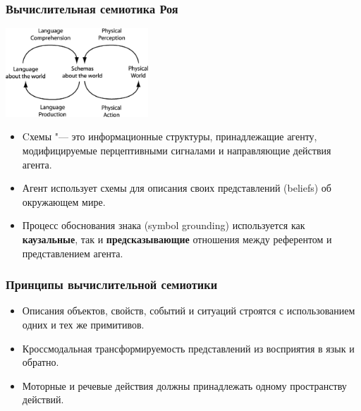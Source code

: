 \documentclass[default]{beamer}
\begin{document}
	\begin{frame}
		\frametitle{Вычислительная семиотика Роя}
		
		\begin{center}
			\includegraphics[width=0.4\textwidth]{roy_grounding}
		\end{center}

		\begin{itemize}
			\item Cхемы "--- это информационные структуры, принадлежащие агенту, модифицируемые перцептивными сигналами и направляющие действия агента.
			\item Агент использует схемы для описания своих представлений (beliefs) об окружающем мире.
			\item Процесс обоснования знака (symbol grounding) используется как \textbf{каузальные}, так и \textbf{предсказывающие} отношения между референтом и представлением агента.
		\end{itemize}
	\end{frame}

	\begin{frame}
		\frametitle{Принципы вычислительной семиотики}
		
		\begin{itemize}
			\item Описания объектов, свойств, событий и ситуаций строятся с использованием одних и тех же примитивов.
			\item Кроссмодальная трансформируемость представлений из восприятия в язык и обратно.
			\item Моторные  и речевые действия должны принадлежать одному пространству действий.
		\end{itemize}
	\end{frame}
\end{document}
